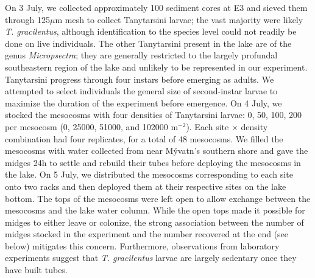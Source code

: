 \documentclass[12pt]{article}
\begin{document}
On 3 July, 
we collected approximately 100 sediment cores at E3 and 
sieved them through 125$\mu \text{m}$ mesh
to collect Tanytarsini larvae; 
the vast majority were likely \textit{T. gracilentus},
although identification to the species level could not readily be done on live individuals.
The other Tanytarsini present in the lake are of the genus \textit{Micropsectra}; 
they are generally restricted to the largely profundal
southeastern region of the lake and unlikely 
to be represented in our experiment.
Tanytarsini progress through four instars before emerging as adults.
We attempted to select individuals the general size of second-instar larvae
to maximize the duration of the experiment before emergence.
On 4 July, we stocked the mesocosms with four densities of Tanytarsini larvae:
0, 50, 100, 200 per mesocosm (0, 25000, 51000, and 102000 $\text{m}^{-2}$). 
Each site $\times$ density combination had four replicates, for a total of 48 mesocosms.
We filled the mesocosms with water collected from near  M\'{y}vatn's southern shore
and gave the midges 24h to settle and rebuild their tubes
before deploying the mesocosms in the lake.
On 5 July, 
we distributed the mesocosms corresponding to each site onto two racks and then
deployed them at their respective sites on the lake bottom.
The tops of the mesocosms were left open to allow exchange between the mesocosms
and the lake water column.
While the open tops made it possible for midges to either leave or colonize,
the strong association between the number of midges stocked in the experiment and 
the number recovered at the end (see below) mitigates this concern.
Furthermore, observations from laboratory experiments \citep[e.g.,][]{wetzel2021}
suggest that \textit{T. gracilentus} larvae are largely sedentary 
once they have built tubes.
\end{document}
